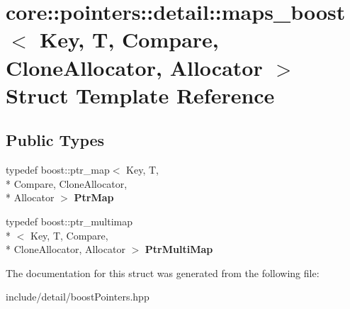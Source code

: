 \hypertarget{structcore_1_1pointers_1_1detail_1_1maps__boost}{\section{core\-:\-:pointers\-:\-:detail\-:\-:maps\-\_\-boost$<$ Key, T, Compare, Clone\-Allocator, Allocator $>$ Struct Template Reference}
\label{structcore_1_1pointers_1_1detail_1_1maps__boost}
}
\subsection*{Public Types}
\begin{DoxyCompactItemize}
\item 
\hypertarget{structcore_1_1pointers_1_1detail_1_1maps__boost_a3020dc41a565296dca884f9c8a71403a}{typedef boost\-::ptr\-\_\-map$<$ Key, T, \\*
Compare, Clone\-Allocator, \\*
Allocator $>$ {\bfseries Ptr\-Map}}\label{structcore_1_1pointers_1_1detail_1_1maps__boost_a3020dc41a565296dca884f9c8a71403a}

\item 
\hypertarget{structcore_1_1pointers_1_1detail_1_1maps__boost_ad4f3be8c6677181fca9eb75565427aa9}{typedef boost\-::ptr\-\_\-multimap\\*
$<$ Key, T, Compare, \\*
Clone\-Allocator, Allocator $>$ {\bfseries Ptr\-Multi\-Map}}\label{structcore_1_1pointers_1_1detail_1_1maps__boost_ad4f3be8c6677181fca9eb75565427aa9}

\end{DoxyCompactItemize}


The documentation for this struct was generated from the following file\-:\begin{DoxyCompactItemize}
\item 
include/detail/boost\-Pointers.\-hpp\end{DoxyCompactItemize}
